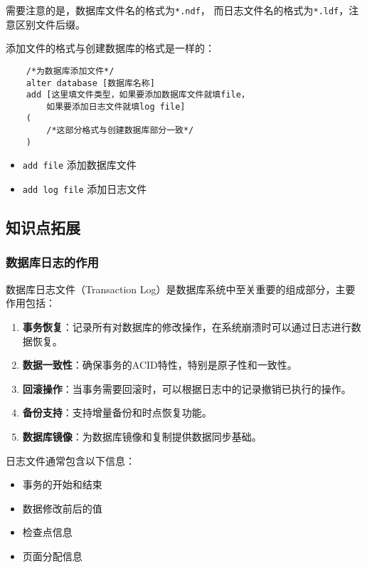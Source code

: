 \qquad 需要注意的是，数据库文件名的格式为\texttt{*.ndf}，
而日志文件名的格式为\texttt{*.ldf}，注意区别文件后缀。

\qquad 添加文件的格式与创建数据库的格式是一样的：

\begin{mdframed}[backgroundcolor=gray!10]
\begin{verbatim}
    /*为数据库添加文件*/
    alter database [数据库名称]
    add [这里填文件类型，如果要添加数据库文件就填file，
        如果要添加日志文件就填log file]
    (
        /*这部分格式与创建数据库部分一致*/
    )
\end{verbatim}
\end{mdframed}

\begin{itemize}
  \item \texttt{add file} 添加数据库文件
  \item \texttt{add log file} 添加日志文件
\end{itemize}

\subsection{知识点拓展}

\subsubsection{数据库日志的作用}

\qquad 数据库日志文件（Transaction Log）是数据库系统中至关重要的组成部分，主要作用包括：

\begin{enumerate}
  \item \textbf{事务恢复}：记录所有对数据库的修改操作，在系统崩溃时可以通过日志进行数据恢复。
  \item \textbf{数据一致性}：确保事务的ACID特性，特别是原子性和一致性。
  \item \textbf{回滚操作}：当事务需要回滚时，可以根据日志中的记录撤销已执行的操作。
  \item \textbf{备份支持}：支持增量备份和时点恢复功能。
  \item \textbf{数据库镜像}：为数据库镜像和复制提供数据同步基础。
\end{enumerate}

\qquad 日志文件通常包含以下信息：
\begin{itemize}
  \item 事务的开始和结束
  \item 数据修改前后的值
  \item 检查点信息
  \item 页面分配信息
\end{itemize}

